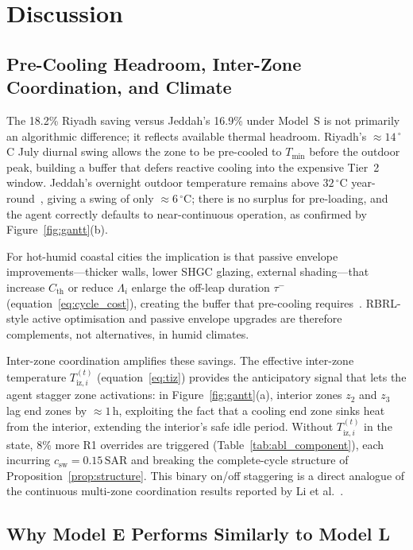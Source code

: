 \documentclass[12pt,a4paper]{article}
\let\oldsection\section
\renewcommand{\section}[1]{\FloatBarrier\oldsection{#1}}
\let\oldsubsection\subsection
\renewcommand{\subsection}[1]{\FloatBarrier\oldsubsection{#1}}
\newcommand{\Tmin}{T_{\min}}
\newcommand{\Cth}{C_{\mathrm{th}}}
\newcommand{\csw}{c_{\mathrm{sw}}}
\newcommand{\SAR}{\text{SAR}}
\newcommand{\Tiz}[1]{T_{\mathrm{iz},#1}}
\newcommand{\taum}{\tau^{-}}
\begin{document}
\section{Discussion}
\label{sec:discussion}

\subsection{Pre-Cooling Headroom, Inter-Zone Coordination, and Climate}
\label{subsec:disc_precool}

The 18.2\% Riyadh saving versus Jeddah's 16.9\% under Model~S is not
primarily an algorithmic difference; it reflects available thermal
headroom.
Riyadh's ${\approx}14\,^\circ$C July diurnal swing allows the zone to
be pre-cooled to $\Tmin$ before the outdoor peak, building a buffer that
defers reactive cooling into the expensive Tier~2 window.
Jeddah's overnight outdoor temperature remains above $32\,^\circ$C
year-round~\cite{Rodrigues2025}, giving a swing of only ${\approx}6\,^\circ$C;
there is no surplus for pre-loading, and the agent correctly defaults to
near-continuous operation, as confirmed by Figure~\ref{fig:gantt}(b).

For hot-humid coastal cities the implication is that passive envelope
improvements---thicker walls, lower SHGC glazing, external shading---that
increase $\Cth$ or reduce $\Lambda_i$ enlarge the off-leap duration $\taum$
(equation~\eqref{eq:cycle_cost}), creating the buffer that pre-cooling
requires~\cite{AlReshidi2024}.
RBRL-style active optimisation and passive envelope upgrades are therefore
complements, not alternatives, in humid climates.

Inter-zone coordination amplifies these savings.
The effective inter-zone temperature $\Tiz{i}^{(t)}$
(equation~\eqref{eq:tiz}) provides the anticipatory signal that lets the
agent stagger zone activations: in Figure~\ref{fig:gantt}(a), interior
zones $z_2$ and $z_3$ lag end zones by ${\approx}1\,\text{h}$, exploiting
the fact that a cooling end zone sinks heat from the interior, extending
the interior's safe idle period.
Without $\Tiz{i}^{(t)}$ in the state, 8\% more R1 overrides are triggered
(Table~\ref{tab:abl_component}), each incurring $\csw=0.15\,\SAR$ and
breaking the complete-cycle structure of Proposition~\ref{prop:structure}.
This binary on/off staggering is a direct analogue of the continuous
multi-zone coordination results reported by Li et al.~\cite{Li2024MZ}.

\subsection{Why Model E Performs Similarly to Model L}
\label{subsec:disc_modele}
\end{document}
